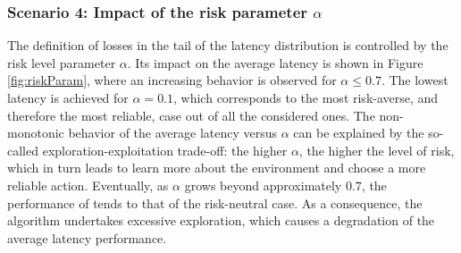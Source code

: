 \subsubsection*{Scenario 4: Impact of the risk parameter $\alpha$}
The definition of losses in the tail of the latency distribution is controlled by the risk level parameter $\alpha$. Its impact on the average latency is shown in Figure \ref{fig:riskParam}, where an increasing behavior is observed for $\alpha\leq 0.7$. The lowest latency is achieved for $\alpha=0.1$, which corresponds to the most risk-averse, and therefore the most reliable, case out of all the considered ones.
The non-monotonic behavior of the average latency versus $\alpha$ can be explained by the so-called exploration-exploitation trade-off: the higher $\alpha$, the higher the level of risk, which in turn leads \name{} to learn more about the environment and choose a more reliable action. Eventually, as $\alpha$ grows beyond approximately $0.7$, the performance of \name{} tends to that of the risk-neutral case. As a consequence, the algorithm undertakes excessive exploration, which causes a degradation of the average latency performance.


